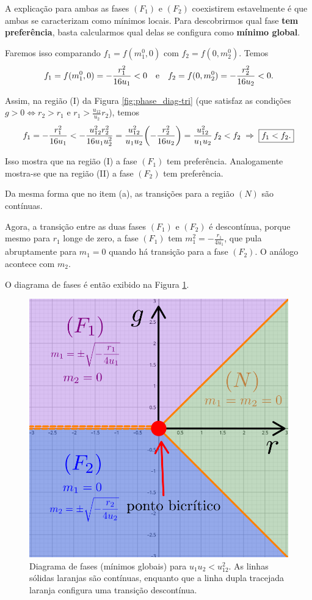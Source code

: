 \documentclass[a4paper,10pt]{article}
\begin{document}
A explicação para ambas as fases $(F_1)$ e $(F_2)$ coexistirem estavelmente é que ambas se caracterizam como mínimos locais. Para descobrirmos qual fase \textbf{tem preferência}, basta calcularmos qual delas se configura como \textbf{mínimo global}.

\n

Faremos isso comparando $f_1 = f(m_1^0, 0)$ com $f_2 = f(0, m_2^0)$. Temos
$$
f_1 = f(m_1^0, 0) = - \frac{r_1^2}{16 u_1} < 0 \quad \mathrm{e} \quad
f_2 = f(0, m_2^0) = - \frac{r_2^2}{16 u_2} < 0.
$$

Assim, na região (I) da Figura \ref{fig:phase_diag-tri} (que satisfaz as condições $g > 0 \iff r_2 > r_1$ e $r_1 > \frac{u_{12}}{u_2} r_2$), temos
$$
f_1 = - \frac{r_1^2}{16 u_1} < -\frac{u_{12}^2 r_2^2}{16 u_1 u_2^2} = \frac{u_{12}^2}{u_1 u_2}\qty(-\frac{r_2^2}{16 u_2}) = \frac{u_{12}^2}{u_1 u_2} \, f_2 < f_2 \; \Rightarrow \; \boxed{f_1 < f_2.}
$$

Isso mostra que na região (I) a fase $(F_1)$ tem preferência. Analogamente mostra-se que na região (II) a fase $(F_2)$ tem preferência.

\n

Da mesma forma que no item (a), as transições para a região $(N)$ são contínuas.

\n

Agora, a transição entre as duas fases $(F_1)$ e $(F_2)$ é descontínua, porque mesmo para $r_1$ longe de zero, a fase $(F_1)$ tem $m_1^2 = -\frac{r_1}{4u_1}$, que pula abruptamente para $m_1 = 0$ quando há transição para a fase $(F_2)$. O análogo acontece com $m_2$.

\n


\n\n

O diagrama de fases é então exibido na Figura \ref{fig:phase_diag-bi}.
\begin{figure}[H]
\centering
\includegraphics[width=0.6\linewidth]{fig/phase_diag-bi.png}
\caption{Diagrama de fases (mínimos globais) para $u_1 u_2 < u_{12}^2$. As linhas sólidas laranjas são contínuas, enquanto que a linha dupla tracejada laranja configura uma transição descontínua.}
\label{fig:phase_diag-bi}
\end{figure}
\end{document}
